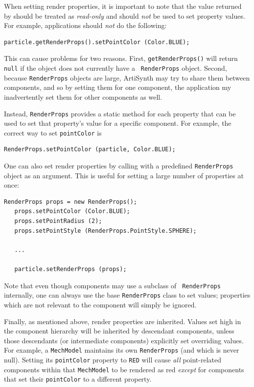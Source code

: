 When setting render properties, it is important to note that
the value returned by
should be treated as {\it read-only} and should {\it not}
be used to set property values.
For example, applications should {\it not} do the
following:
\begin{lstlisting}[]
   particle.getRenderProps().setPointColor (Color.BLUE);
\end{lstlisting}
%
This can cause problems for two reasons. First, {\tt getRenderProps()}
will return {\tt null} if the object does not currently have a {\tt
RenderProps} object. Second, because {\tt RenderProps} objects are
large, ArtiSynth may try to share them between components, and so by
setting them for one component, the application my inadvertently set
them for other components as well.

Instead, {\tt RenderProps} provides a static method for each property
that can be used to set that property's value for a specific
component.  For example, the correct way to set {\tt pointColor} is
%
\begin{lstlisting}[]
   RenderProps.setPointColor (particle, Color.BLUE);
\end{lstlisting}
%

One can also set render properties by calling
 with a
predefined {\tt RenderProps} object as an argument. This is useful for
setting a large number of properties at once:
%
\begin{lstlisting}[]
   RenderProps props = new RenderProps();
   props.setPointColor (Color.BLUE);
   props.setPointRadius (2);
   props.setPointStyle (RenderProps.PointStyle.SPHERE);

   ...

   particle.setRenderProps (props);
\end{lstlisting}

\begin{sideblock}
Note that even though components may use a subclass of {\tt
RenderProps} internally, one can always use the base {\tt RenderProps}
class to set values; properties which are not relevant to the
component will simply be ignored.
\end{sideblock}

Finally, as mentioned above, render properties are inherited.  Values
set high in the component hierarchy will be inherited by descendant
components, unless those descendants (or intermediate components)
explicitly set overriding values.  For example, a {\tt MechModel}
maintains its own {\tt RenderProps} (and which is never null). Setting
its {\tt pointColor} property to {\tt RED} will cause {\it all}
point-related components within that {\tt MechModel} to be rendered as
red {\it except} for components that set their {\tt pointColor} to a
different property.

